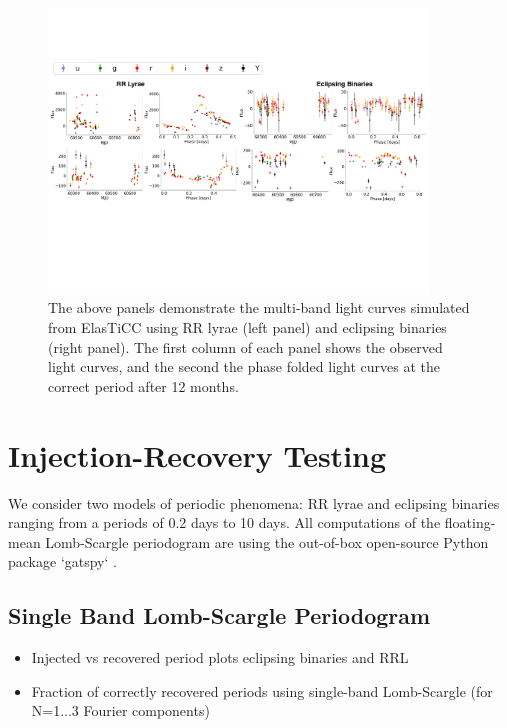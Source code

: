 \documentclass[DM,authoryear,toc]{lsstdoc}
\begin{document}
\begin{figure}
  \includegraphics[width=0.9\textwidth]{figures/lightcurve_demo.pdf}
  \centering 
  \caption{The above panels demonstrate the multi-band light curves simulated from ElasTiCC using RR lyrae (left panel) and eclipsing binaries (right panel). The first column of each panel shows the observed light curves, and the second the phase folded light curves at the correct period after 12 months.}
  \label{fig:comp}
\end{figure}


\section{Injection-Recovery Testing}

We consider two models of periodic phenomena: RR lyrae and eclipsing binaries ranging from a periods of 0.2 days to 10 days. All computations of the floating-mean Lomb-Scargle periodogram are using the out-of-box open-source Python package `gatspy` \citet{VanderPlas:VP2015}. 



\subsection{Single Band Lomb-Scargle Periodogram}

\begin{itemize}
\item Injected vs recovered period plots eclipsing binaries and RRL
\item Fraction of correctly recovered periods using single-band Lomb-Scargle (for N=1...3 Fourier components)  
\end{itemize}
\end{document}
